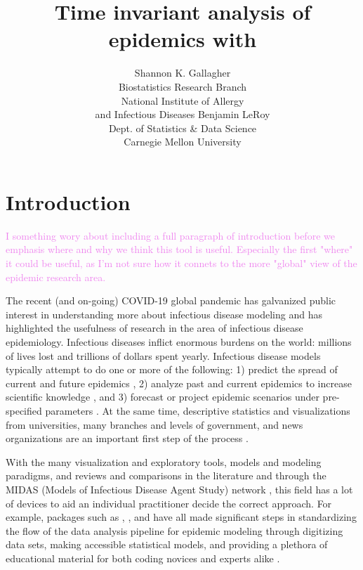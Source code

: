 \documentclass[
  shortnames]{jss}
\author{
Shannon K. Gallagher\\Biostatistics Research Branch\\
National Institute of Allergy\\
and Infectious Diseases \And Benjamin LeRoy\\Dept. of Statistics \& Data Science\\
Carnegie Mellon University
}
\title{Time invariant analysis of epidemics with \pkg{EpiCompare}}
\begin{document}
\newcommand{\shannon}[1]{\textcolor{orange}{#1}}
\newcommand{\ben}[1]{\textcolor{violet}{#1}}

\newtheorem{theorem}{Theorem}

\section[Intro]{Introduction}\label{sec:intro}

\textcolor{violet}{I something wory about including a full paragraph of introduction before we emphasis where and why we think this tool is useful. Especially the first "where" it could be useful, as I'm not sure how it connets to the more "global" view of the epidemic research area.}

The recent (and on-going) COVID-19 global pandemic has galvanized public
interest in understanding more about infectious disease modeling and has
highlighted the usefulness of research in the area of infectious disease
epidemiology. Infectious diseases inflict enormous burdens on the world:
millions of lives lost and trillions of dollars spent yearly. Infectious
disease models typically attempt to do one or more of the following: 1)
predict the spread of current and future epidemics
\citep[e.g. flu prediction][]{Biggerstaff2016}, 2) analyze past and
current epidemics to increase scientific knowledge
\citep[e.g. historical measle outbreaks][]{Neal2004}, and 3) forecast or
project epidemic scenarios under pre-specified parameters
\citep[e.g.][]{ferguson2020}. At the same time, descriptive statistics
and visualizations from universities, many branches and levels of
government, and news organizations are an important first step of the
process \citep{dong2020,cdc-covid-tracker2021,wp-covid-tracker2021} .

With the many visualization and exploratory tools, models and modeling
paradigms, and reviews and comparisons in the literature and through the
MIDAS (Models of Infectious Disease Agent Study) network
\citep{midasnetwork2021}, this field has a lot of devices to aid an
individual practitioner decide the correct approach. For
example, packages such as ,
, and  have all made significant steps in
standardizing the flow of the data analysis pipeline for epidemic
modeling through digitizing data sets, making accessible statistical
models, and providing a plethora of educational material for both coding
novices and experts alike \citep{surveillance2017,Jenness2018,King2016}.
\end{document}

